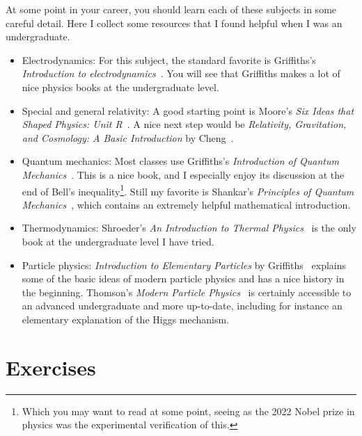 At some point in your career, you should learn each of these subjects in some
careful detail. Here I collect some resources that I found helpful when I was an
undergraduate. 
\begin{itemize}
  \item Electrodynamics: For this subject, the standard favorite is
Griffiths's {\it Introduction to electrodynamics}~\cite{Griffiths:1492149}.
You will see that Griffiths makes a lot of nice physics books at the
undergraduate level.
  \item Special and general relativity:
A good starting point is Moore's {\it Six Ideas that Shaped Physics: Unit
R}~\cite{moore2002six}. A nice next step would be {\it Relativity, Gravitation,
and Cosmology: A Basic Introduction} by Cheng~\cite{alma997111578601771}.
  \item Quantum mechanics:
Most classes use Griffiths's {\it Introduction of Quantum
Mechanics}~\cite{griffiths_introduction_2005}. This is a nice book, and I especially enjoy
its discussion at the end of Bell's inequality\footnote{Which you may want to
read at some point, seeing as the 2022 Nobel prize in physics was the
experimental verification of this.}. Still my favorite is Shankar's
{\it Principles of Quantum Mechanics}~\cite{Shankar:102017}, which contains an
extremely helpful mathematical introduction.
  \item Thermodynamics:
Shroeder's {\it An Introduction to Thermal
Physics}~\cite{schroeder2021introduction} is the only book at the undergraduate
level I have tried.
  \item Particle physics:
{\it Introduction to Elementary Particles} by
Griffiths~\cite{griffiths_introduction_2007} explains some of the basic ideas of
modern particle physics and has a nice history in the beginning. Thomson's
{\it Modern Particle Physics}~\cite{thomson_modern_2013} is certainly accessible to an advanced
undergraduate and more up-to-date, including for instance an elementary
explanation of the Higgs mechanism.
\end{itemize}

\section*{Exercises}

